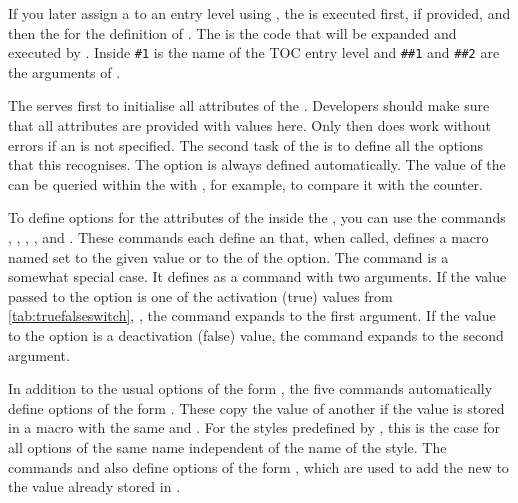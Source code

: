 If you later assign a  to an entry level using
, the  is
executed first, if provided, and then the  for the
definition of . The  is the
code that will be expanded and executed by .
Inside  \texttt{\#1} is the name of the TOC entry level
and \texttt{\#\#1} and \texttt{\#\#2} are the arguments of
.

The  serves first to initialise all attributes of the
. Developers should make sure that all attributes are provided
with values here. Only then does 
work without errors if an  is not specified. The second
task of the  is to define all the options that this
 recognises. The  option is always defined
automatically. The value of the  can be queried within the
 with %
, for example, to compare it
with the  counter.

To define options for the attributes of the  inside the
, you can use the commands
, ,
, , and
.  These commands each define an
 that, when called, defines a macro named
 set to the given
value or to the  of the option. The
 command is a somewhat special case. It defines
 as a command with two
arguments. If the value passed to the option is one of the activation (true)
values from \autoref{tab:truefalseswitch}, ,
the command expands to the first argument. If the value to the option is a
deactivation (false) value, the command expands to the second argument.

In addition to the usual options of the
form , the five
 commands automatically define options of
the form . These copy the value of
another  if the value is stored in a macro with the same
 and . For the styles predefined by
, this is the case for all options of the same name
independent of the name of the style. The commands
 and  also
define options of the form , which are used
to add the new  to the value already stored in
.

